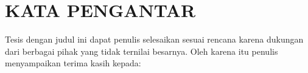 %
%

\chapter*{KATA PENGANTAR}


Tesis dengan judul \textbf{\ThesisTitle} ini dapat penulis selesaikan sesuai rencana karena dukungan dari berbagai pihak yang tidak ternilai besarnya. Oleh karena itu penulis menyampaikan terima kasih kepada:

